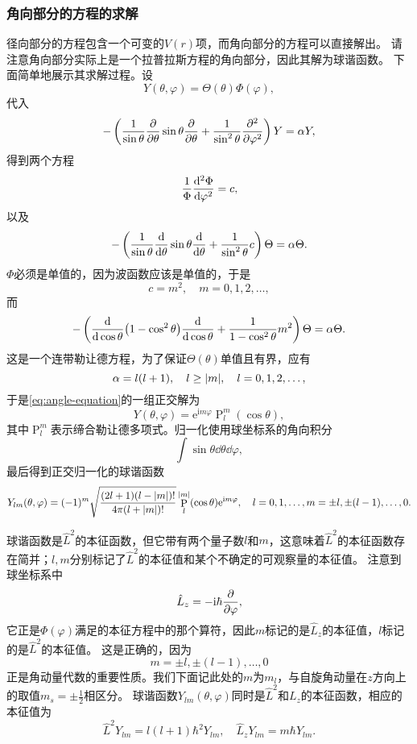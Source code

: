 \documentclass[UTF8, a4paper]{ctexart}
\newcommand*{\ee}{\mathrm{e}}
\newcommand*{\ii}{\mathrm{i}}
\DeclareMathOperator{\legpoly}{P}
\begin{document}
\subsubsection{角向部分的方程的求解}

径向部分的方程包含一个可变的$V(r)$项，而角向部分的方程可以直接解出。
请注意角向部分实际上是一个拉普拉斯方程的角向部分，因此其解为球谐函数。
下面简单地展示其求解过程。设
\[
    Y(\theta, \varphi) = \Theta(\theta) \Phi(\varphi),
\]
代入
\[
    - \left( \frac{1}{\sin \theta} \pdv{\theta} \sin \theta \pdv{\theta} + \frac{1}{\sin^2 \theta} \pdv[2]{\varphi} \right) Y = \alpha Y,
\]
得到两个方程
\[
    \frac{1}{\Phi} \dv[2]{\Phi}{\varphi} = c,
\]
以及
\[
    - \left( \frac{1}{\sin \theta} \dv{\theta} \sin \theta \dv{\theta} + \frac{1}{\sin^2 \theta} c \right) \Theta = \alpha \Theta.
\]
$\Phi$必须是单值的，因为波函数应该是单值的，于是
\[
    c = m^2, \quad m = 0, 1, 2, \ldots,
\]
而
\[
    - \left( \dv{\cos \theta} (1 - \cos^2 \theta) \dv{\cos \theta} + \frac{1}{1 - \cos^2 \theta} m^2 \right) \Theta = \alpha \Theta.
\]
这是一个连带勒让德方程，为了保证$\Theta(\theta)$单值且有界，应有
\[
    \alpha = l(l+1), \quad l \geq \abs{m}, \quad l = 0, 1, 2, \ldots,
\]
于是\eqref{eq:angle-equation}的一组正交解为
\[
    Y(\theta, \varphi) = \ee^{\ii m \varphi} \legpoly_l^m(\cos \theta),
\]
其中$\legpoly_l^m$表示缔合勒让德多项式。归一化使用球坐标系的角向积分
\[
    \int \sin \theta \dd{\theta} \dd{\varphi},
\]
最后得到正交归一化的球谐函数
\begin{equation}
    Y_{lm}(\theta, \varphi) = (-1)^m \sqrt{\frac{(2l+1)(l-\abs{m})!}{4\pi (l+\abs{m})!}} \legpoly_l^\abs{m} (\cos \theta) \ee^{\ii m \varphi}, \quad l = 0, 1, \ldots, m = \pm l, \pm (l-1), \ldots, 0 .
\end{equation}

球谐函数是$\hat{L}^2$的本征函数，但它带有两个量子数$l$和$m$，这意味着$\hat{L}^2$的本征函数存在简并；$l,m$分别标记了$\hat{L}^2$的本征值和某个不确定的可观察量的本征值。
注意到球坐标系中
\[
    \hat{L}_z = - \ii \hbar \pdv{\varphi},
\]
它正是$\Phi(\varphi)$满足的本征方程中的那个算符，因此$m$标记的是$\hat{L}_z$的本征值，$l$标记的是$\hat{L}^2$的本征值。
这是正确的，因为
\[
    m = \pm l, \pm (l-1), \ldots, 0
\]
正是角动量代数的重要性质。我们下面记此处的$m$为$m_l$，与自旋角动量在$z$方向上的取值$m_s = \pm \frac{1}{2}$相区分。
球谐函数$Y_{lm}(\theta, \varphi)$同时是$\hat{L}^2$和$L_z$的本征函数，相应的本征值为
\begin{equation}
    \hat{L}^2 Y_{lm} = l(l+1) \hbar^2 Y_{lm}, \quad \hat{L}_z Y_{lm} = m \hbar Y_{lm}.
\end{equation}
\end{document}
